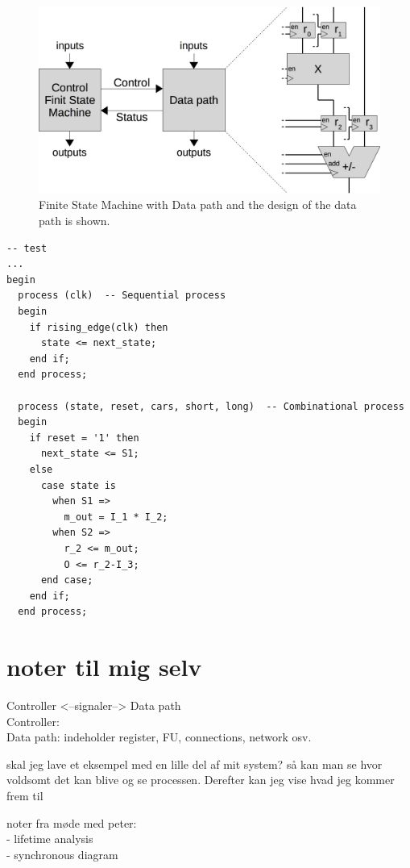 \begin{figure}[ht!]
  \centering
  \includegraphics[scale=0.3]{figures/b_FSMD_full}
  \caption{Finite State Machine with Data path and the design of the data path is shown.}
  \label{fig:b_FSMD_full}
\end{figure}
\begin{lstlisting}
-- test
...
begin
  process (clk)  -- Sequential process
  begin 
    if rising_edge(clk) then
      state <= next_state;
    end if;
  end process;
  
  process (state, reset, cars, short, long)  -- Combinational process
  begin
    if reset = '1' then
      next_state <= S1;
    else
      case state is
        when S1 =>
          m_out = I_1 * I_2;
        when S2 =>
          r_2 <= m_out;
          O <= r_2-I_3;
      end case;
    end if;
  end process;      
\end{lstlisting}

\color{gray}
\section*{noter til mig selv}
Controller <--signaler--> Data path\\
Controller:\\
Data path:  indeholder register, FU, connections, network osv.

skal jeg lave et eksempel med en lille del af mit system? så kan man se hvor voldsomt det kan blive og se processen. Derefter kan jeg vise hvad jeg kommer frem til

noter fra møde med peter:\\
- lifetime analysis \\
- synchronous diagram
\color{black}

